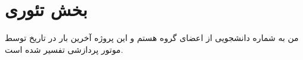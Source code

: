 \documentclass[twoside]{article}
\begin{document}
\maketitlebox
\section*{بخش تئوری}
من  به شماره دانشجویی \StudentID{} از اعضای گروه  هستم و این پروژه آخرین بار در تاریخ \CompileDate{}
توسط موتور پردازشی \XeLaTeX تفسیر شده است.
\end{document}
